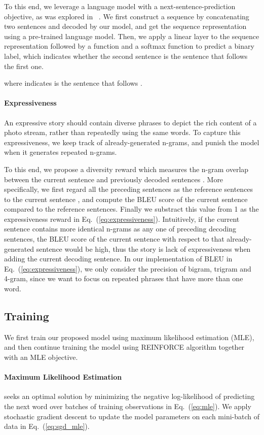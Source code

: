 \documentclass[letterpaper]{article} \usepackage{aaai20}  \usepackage{times}  \usepackage{helvet} \usepackage{courier}  \usepackage[hyphens]{url}  \usepackage{graphicx} \urlstyle{rm} \def\UrlFont{\rm}  \usepackage{graphicx}  \frenchspacing  \setlength{\pdfpagewidth}{8.5in}  \setlength{\pdfpageheight}{11in}  \usepackage{times}
\newcommand{\citet}[1]{\citeauthor{#1} \shortcite{#1}}
\begin{document}
To this end, we leverage a language model with a next-sentence-prediction objective, as was explored in~\citet{devlin2018bert}. We first construct a sequence by concatenating two sentences  and  decoded by our model, and get the sequence representation using a pre-trained language model. Then, we apply a linear layer to the sequence representation followed by a  function and a softmax function to predict a binary label, which indicates whether the second sentence is the sentence that follows the first one.

where  indicates  is the sentence that follows . 
\paragraph{Expressiveness}
An expressive story should contain diverse phrases to depict the rich content of a photo stream, rather than repeatedly using the same words. To capture this expressiveness, we keep track of already-generated n-grams, and punish the model when it generates repeated n-grams. 

To this end, we propose a diversity reward which measures the n-gram overlap between the current sentence  and previously decoded sentences . More specifically, we first regard all the preceding sentences  as the reference sentences to the current sentence , and compute the BLEU score of the current sentence compared to the reference sentences. Finally we substract this value from 1 as the expressiveness reward in Eq.~(\ref{eq:expressiveness}). Intuitively, if the current sentence contains more identical n-grams as any one of preceding decoding sentences, the BLEU score of the current sentence with respect to that already-generated sentence would be high, thus the story is lack of expressiveness when adding the current decoding sentence. In our implementation of BLEU in Eq.~(\ref{eq:expressiveness}), we only consider the precision of bigram, trigram and 4-gram, since we want to focus on repeated phrases that have more than one word. 


\subsection{Training}
\label{sec:train}
We first train our proposed model using maximum likelihood estimation (MLE), and then continue training the model using REINFORCE algorithm together with an MLE objective.
\paragraph{Maximum Likelihood Estimation} seeks an optimal solution  by minimizing the negative log-likelihood of predicting the next word over batches of training observations in Eq.~(\ref{eq:mle}). We apply stochastic gradient descent to update the model parameters on each mini-batch of data  in Eq.~(\ref{eq:sgd_mle}).
\end{document}
